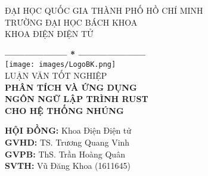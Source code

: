 \documentclass[12pt, a4paper, oneside]{book}
\newcommand{\csdeptname}{KHOA ĐIỆN ĐIỆN TỬ}
\newcommand{\csCouncil}{Khoa Điện Điện tử}
\newcommand{\csSupervise}{TS. Trương Quang Vinh}
\newcommand{\csReviewer}{ThS. Trần Hoàng Quân}
\newcommand{\crname}{LUẬN VĂN TỐT NGHIỆP} %
\newcommand{\csSVone}{Vũ Đăng Khoa}
\newcommand{\csidSVone}{1611645}
\begin{document}
\frontmatter

\begin{titlepage}

\begin{center}
\begin{large}
ĐẠI HỌC QUỐC GIA THÀNH PHỐ HỒ CHÍ MINH\\
TRƯỜNG ĐẠI HỌC BÁCH KHOA\\
\csdeptname\\
\end{large}
\textbf{--------------------  *  ---------------------}\\[1.2cm]
\texttt{[image: images/LogoBK.png]}\\[1.2cm]
{\fontsize{15}{1}\selectfont \crname }\\[0.8cm]

{\fontsize{24}{1}\selectfont \textbf{PHÂN TÍCH VÀ ỨNG DỤNG\\NGÔN NGỮ LẬP TRÌNH RUST\\CHO HỆ THỐNG NHÚNG}}\\[2.3cm]
\end{center}

\begin{flushright}
    \begin{minipage}{0.6\textwidth}
        \large
        \textbf{HỘI ĐỒNG:} \csCouncil\\[0.1cm]
        \textbf{GVHD:} \csSupervise\\[0.1cm]
        \textbf{GVPB:} \csReviewer\\[0.5cm]
        \textbf{SVTH:} \csSVone{} (\csidSVone)
    \end{minipage}
\end{flushright}


\end{titlepage}
\end{document}
